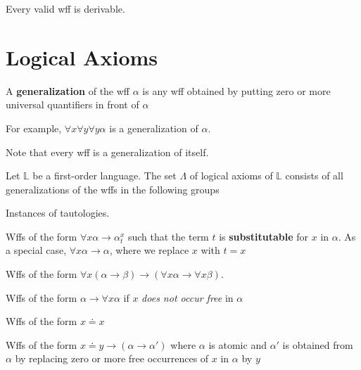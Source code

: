 \begin{theorem}[Completeness]
    \label{thm:FOCompleteness}
    Every valid wff is derivable.
\end{theorem}

\section{Logical Axioms}

\begin{definition}[Generalization]
    A \textbf{generalization} of the wff $\alpha$ is any wff obtained by putting zero or more universal quantifiers in front of $\alpha$
\end{definition}

For example, $\forall x\forall y\forall y\alpha$ is a generalization of $\alpha$.

Note that every wff is a generalization of itself.

\begin{definition}[Axioms]
    Let $\mathbb{L}$ be a first-order language. The set $\Lambda$ of logical axioms of $\mathbb{L}$ consists of all generalizations of the wffs in the following groups
    \begin{axiom}
        \label{axiom:InstanceOfTautology}
        Instances of tautologies.
    \end{axiom}
    \begin{axiom}
        \label{axiom:Substitution}
        Wffs of the form $\forall x\alpha \to \alpha_t^x$ such that the term $t$ is \textbf{substitutable} for $x$ in $\alpha$. As a special case, $\forall x\alpha \to \alpha$, where we replace $x$ with $t=x$
    \end{axiom}
    \begin{axiom}
        \label{axiom:PushUniversalIntoImplication}
        Wffs of the form $\forall x(\alpha\to\beta) \to (\forall x \alpha\to \forall x \beta)$.
    \end{axiom}
    \begin{axiom}
        \label{axiom:QuantifyBoundedVar}
        Wffs of the form $\alpha\to\forall x \alpha$ if $x$ \emph{does not occur free} in $\alpha$
    \end{axiom}
    \begin{axiom}
        \label{axiom:Equality}
        Wffs of the form $x \doteq x$
    \end{axiom}
    \begin{axiom}
        \label{axiom:EqualitySubstitution}
        Wffs of the form $x \doteq y \to (\alpha \to \alpha')$ where $\alpha$ is atomic and $\alpha'$ is obtained from $\alpha$ by replacing zero or more free occurrences of $x$ in $\alpha$ by $y$
    \end{axiom}
\end{definition}

